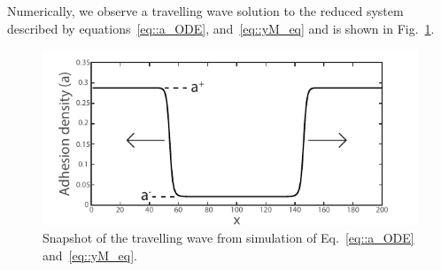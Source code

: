 Numerically, we observe a travelling wave solution to the reduced system described by equations~\ref{eq::a_ODE}, and~\ref{eq::yM_eq} and is shown in Fig.~\ref{fig::A_wave}.
\begin{figure}[h]
\centering
\captionsetup{width=.9\linewidth}
\includegraphics[width=4.5in]{Project2/figs/A_wave.pdf}
\caption{Snapshot of the travelling wave from simulation of Eq.~\ref{eq::a_ODE} and~\ref{eq::yM_eq}.}
\label{fig::A_wave}
\end{figure}

